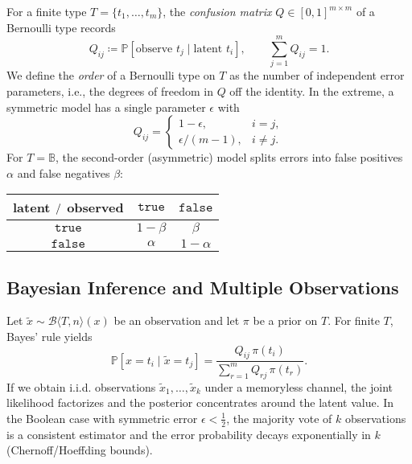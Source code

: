 \documentclass[11pt,final,hidelinks]{article}
\newcommand{\bernoulli}[2]{\mathcal{B}\langle #1, #2 \rangle}
\newcommand{\Bool}{\mathbb{B}}
\newcommand{\True}{\mathtt{true}}
\newcommand{\False}{\mathtt{false}}
\newcommand{\Prob}[1]{\mathbb{P}\left[#1\right]}
\newcommand{\fprate}{\alpha}
\newcommand{\fnrate}{\beta}
\begin{document}
For a finite type $T=\{t_1,\dots,t_m\}$, the \emph{confusion matrix} $Q\in[0,1]^{m\times m}$ of a Bernoulli type records
\begin{equation}
    Q_{ij} \coloneqq \Prob{\text{observe } t_j \mid \text{latent } t_i}, \qquad \sum_{j=1}^m Q_{ij}=1.
\end{equation}
We define the \emph{order} of a Bernoulli type on $T$ as the number of independent error parameters, i.e., the degrees of freedom in $Q$ off the identity. In the extreme, a symmetric model has a single parameter $\epsilon$ with
\begin{equation}
    Q_{ij}=\begin{cases}1-\epsilon,& i=j,\\[2pt] \epsilon/(m-1),& i\neq j.\end{cases}
\end{equation}
For $T=\Bool$, the second-order (asymmetric) model splits errors into false positives $\fprate$ and false negatives $\fnrate$:
\begin{center}
\begin{tabular}{c|cc}
latent $\\/\\$ observed & $\True$ & $\False$ \\ \hline
$\True$ & $1-\fnrate$ & $\fnrate$ \\
$\False$ & $\fprate$ & $1-\fprate$
\end{tabular}
\end{center}

\subsection{Bayesian Inference and Multiple Observations}

Let $\tilde{x}\sim\bernoulli{T}{n}(x)$ be an observation and let $\pi$ be a prior on $T$. For finite $T$, Bayes' rule yields
\begin{equation}
    \Prob{x=t_i\mid \tilde{x}=t_j} = \frac{Q_{ij}\,\pi(t_i)}{\sum_{r=1}^m Q_{rj}\,\pi(t_r)}.
\end{equation}
If we obtain i.i.d. observations $\tilde{x}_1,\dots,\tilde{x}_k$ under a memoryless channel, the joint likelihood factorizes and the posterior concentrates around the latent value. In the Boolean case with symmetric error $\epsilon<\tfrac12$, the majority vote of $k$ observations is a consistent estimator and the error probability decays exponentially in $k$ (Chernoff/Hoeffding bounds).
\end{document}
